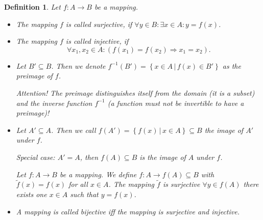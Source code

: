 \documentclass[a4paper,landscape,twocolumn]{article}
\newtheorem{defi}{Definition}
\newcommand\setdef[2]{\left\{#1\,|\,#2\right\}}
\begin{document}
\begin{defi}
  Let $f: A \rightarrow B$ be a mapping.
  \begin{itemize}
    \item
      The mapping $f$ is called \emph{surjective},
      if $\forall y \in B: \exists x \in A: y = f(x)$.
    \item
      The mapping $f$ is called \emph{injective}, if
      \[ \forall x_1, x_2 \in A: (f(x_1) = f(x_2) \Rightarrow x_1 = x_2). \]
    \item
      Let $B' \subseteq B$. Then we denote $f^{-1}(B') = \setdef{x \in A}{f(x) \in B'}$ as the \emph{preimage of $f$}.

      Attention! The preimage distinguishes itself from the domain (it is a subset)
      and the inverse function $f^{-1}$ (a function must not be invertible to have a preimage)!
    \item
      Let $A' \subseteq A$. Then we call $f(A') = \setdef{f(x)}{x \in A} \subseteq B$ the \emph{image of $A'$} under $f$.

      Special case: $A' = A$, then $f(A) \subseteq B$ is the image of $A$ under $f$.

      Let $f: A \rightarrow B$ be a mapping. We define $f: A \rightarrow f(A) \subseteq B$ with
      $\tilde f(x) = f(x)$ for all $x \in A$. The mapping $\tilde f$ is surjective $\forall y \in f(A)$ there exists one $x \in A$ such that $y = f(x)$.
    \item
      A mapping is called \emph{bijective}
      iff the mapping is surjective and injective.
  \end{itemize}
\end{defi}
\end{document}
